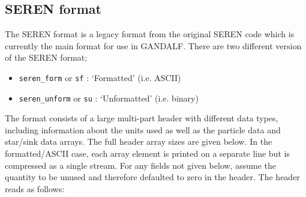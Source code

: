 \documentclass[a4paper]{article}
\newcommand{\var}[1]{\texttt{#1}}
\begin{document}
\subsection{SEREN format}
The SEREN format is a legacy format from the original SEREN code which is currently the main format for use in GANDALF.  There are two different version of the SEREN format; 
\begin{itemize}
\item \var{seren\_form} or \var{sf} : `Formatted' (i.e. ASCII)
\item \var{seren\_unform} or \var{su} : `Unformatted' (i.e. binary)
\end{itemize}
The format consists of a large multi-part header with different data types, including information about the units used as well as the particle data and star/sink data arrays.  The full header array sizes are given below.  In the formatted/ASCII case, each array element is printed on a separate line but is compressed as a single stream.  For any fields not given below, assume the quantity to be unused and therefore defaulted to zero in the header.  The header reads as follows: 
\end{document}
